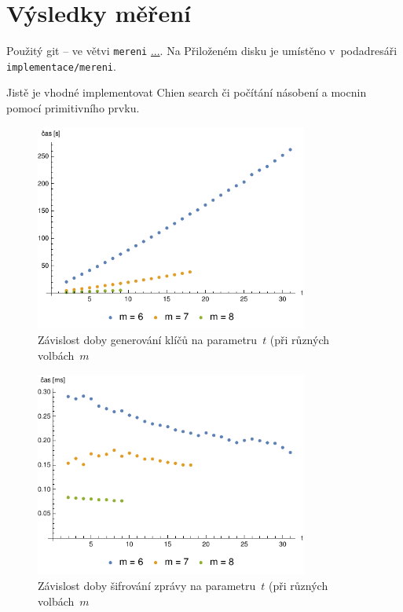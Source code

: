 \documentclass[thesis=M,czech,hidelinks]{FITthesis}[2012/06/26]
\newcommand{\0}{{\textcolor[gray]{0.75}{0}}}
\begin{document}
\section{Výsledky měření}
Použitý git -- ve větvi \texttt{mereni} \url{...}. Na Přiloženém disku je umístěno
v~podadresáři \texttt{implementace/mereni}.


Jistě je vhodné implementovat Chien search či počítání násobení a mocnin pomocí
primitivního prvku.


\begin{figure}[!ht]
    \centering
    \includegraphics[width=0.8\textwidth]{../implementace/grafy/listplot_m6-8_generovani.pdf}
    \caption{
        Závislost doby generování klíčů na parametru~$t$ (při různých
        volbách~$m$
    }
    \label{obr_mereni_t_gen}
\end{figure}

\begin{figure}[!ht]
    \centering
    \includegraphics[width=0.8\textwidth]{../implementace/grafy/listplot_m6-8_sifrovani.pdf}
    \caption{
        Závislost doby šifrování zprávy na parametru~$t$ (při různých
        volbách~$m$
    }
    \label{obr_mereni_t_sifr}
\end{figure}
\end{document}
